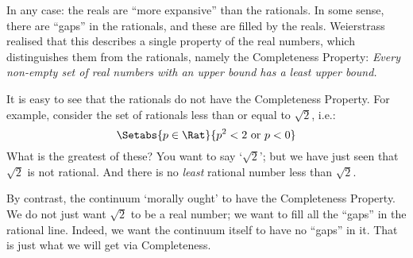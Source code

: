 \documentclass[../../../include/open-logic-section]{subfiles}
\begin{document}
In any case: the reals are ``more expansive'' than the rationals. In some sense, there are ``gaps'' in the rationals, and these are filled by the reals. Weierstrass realised that this describes a single property of the real numbers, which distinguishes them from the rationals, namely the Completeness Property: \emph{Every non-empty set of real numbers with an upper bound has a least upper bound.} 

It is easy to see that the rationals do not have the Completeness Property. For example, consider the set of rationals less than or equal to $\sqrt{2}$, i.e.:
$$\Setabs{p \in \Rat}{p^2 < 2 \text{ or }p < 0}$$
What is the greatest of these? You want to say `$\sqrt{2}$'; but we have just seen that $\sqrt{2}$ is not rational. And there is no \emph{least} rational number less than $\sqrt{2}$. 

By contrast, the continuum `morally ought' to have the Completeness Property. We do not just want $\sqrt{2}$ to be a real number; we want to fill all the ``gaps'' in the rational line. Indeed, we want the continuum itself to have no ``gaps'' in it. That is just what we will get via Completeness.
\end{document}
